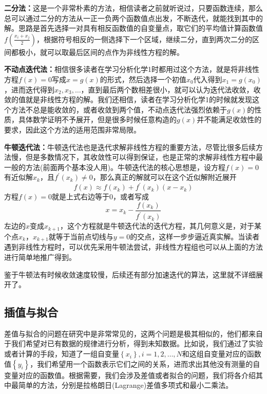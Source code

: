 \documentclass[12pt,a4paper,openany,twoside]{book}
\numberwithin{equation}{section}
\begin{document}
      \textbf{二分法：}这是一个非常朴素的方法，相信读者之前就听说过，只要函数连续，那么总可以通过二分的方法从一正一负两个函数值点出发，不断迭代，就能找到其中的解。思路是首先选择一对具有相反函数值的自变量点，取它们的平均值计算函数值$f(\frac{x_i + x_j}{2})$，根据符号相反的一侧选择下一个区域，继续二分，直到两次二分的区间都极小，就可以取最后区间的点作为非线性方程的解。

      \textbf{不动点迭代法：}相信很多读者在学习分析化学1时都用过这个方法，就是将非线性方程$f(x)=0$写成$x = g(x)$的形式，然后选择一个初值$x_0$代入得到$x_1 = g(x_0)$，进而迭代得到$x_2,x_3,\dots$，直到最后两个数相差很小，就可以认为迭代法收敛，收敛的值就是非线性方程的解。我们还相信，读者在学习分析化学1的时候就发现这个方法不总是能收敛的，或者收敛到两个值，不动点迭代法强烈依赖于$g(x)$的性质，具体数学证明不予展开，但是很多时候任意构造的$g(x)$并不能满足收敛性的要求，因此这个方法的适用范围非常局限。

      \textbf{牛顿迭代法：}牛顿迭代法也是迭代求解非线性方程的重要方法，尽管比很多后续方法慢，但是多数情况下，其收敛性可以得到保证，也是正常的求解非线性方程中最一般的方法(前面两个基本没人用)。牛顿迭代法的核心思想是，设方程$f(x)=0$有近似解$x_k$，且$f^{\prime}(x_k)\neq0$，那么真正的解就可以在这个近似解附近展开
      \begin{equation*}
        f(x) \approx f\left(x_{k}\right)+f^{\prime}\left(x_{k}\right)\left(x-x_{k}\right)
      \end{equation*}
      方程$f(x)=0$就是上式右边等于0，或者写成
      \begin{equation*}
        x=x_{k}-\frac{f\left(x_{k}\right)}{f^{\prime}\left(x_{k}\right)}
      \end{equation*}
      左边的$x$变成$x_{k+1}$，这个方程就是牛顿迭代法的迭代方程，其几何意义是，对于某个点$x_k$，$x_{k+1}$就等于当前点切线与$y=0$的交点，这样一步步逼近真实解。当读者遇到非线性方程时，可以优先采用牛顿法尝试，非线性方程组也可以从上面的方法进行简单地推广得到。

      鉴于牛顿法有时候收敛速度较慢，后续还有部分加速迭代的算法，这里就不详细展开了。
    \subsection{插值与拟合}
      差值与拟合的问题在研究中是非常常见的，这两个问题是极其相似的，他们都来自于我们希望对已有数据的规律进行分析，得到未知数据。比如说，我们通过了实验或者计算的手段，知道了一组自变量$\left\{x_i\right\},i=1,2,\dots,N$和这组自变量对应的函数值$\left\{y_i\right\}$，我们希望用一个函数表示它们之间的关系，进而求出其他没有测量的自变量对应的函数值。根据需要，我们会涉及差值或者拟合的问题，我们将各介绍其中最简单的方法，分别是拉格朗日(Lagrange)差值多项式和最小二乘法。
\end{document}
